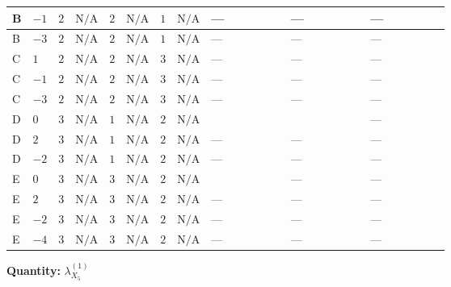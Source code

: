 \documentclass[8pt]{article}
\begin{document}
\begin{landscape}
\begin{longtable}{@{}llcccccc >{\raggedright\arraybackslash}p{0.21\linewidth} >{\raggedright\arraybackslash}p{0.21\linewidth} >{\raggedright\arraybackslash}p{0.21\linewidth}@{}}
\midrule
B & $-1$ & $2$ & $\text{N/A}$ & $2$ & $\text{N/A}$ & $1$ & $\text{N/A}$ & --- & --- & --- \\
\midrule
B & $-3$ & $2$ & $\text{N/A}$ & $2$ & $\text{N/A}$ & $1$ & $\text{N/A}$ & --- & --- & --- \\
\midrule
C & $1$ & $2$ & $\text{N/A}$ & $2$ & $\text{N/A}$ & $3$ & $\text{N/A}$ & --- & --- & --- \\
\midrule
C & $-1$ & $2$ & $\text{N/A}$ & $2$ & $\text{N/A}$ & $3$ & $\text{N/A}$ & --- & --- & --- \\
\midrule
C & $-3$ & $2$ & $\text{N/A}$ & $2$ & $\text{N/A}$ & $3$ & $\text{N/A}$ & --- & --- & --- \\
\midrule
D & $0$ & $3$ & $\text{N/A}$ & $1$ & $\text{N/A}$ & $2$ & $\text{N/A}$ & \scriptsize\adjustbox{max width=\linewidth}{$\begin{gathered} +2 {\lambda_{S_1}^{(1)}} {\lambda_{X_{5}}^{(1)}}\end{gathered}$} & \scriptsize\adjustbox{max width=\linewidth}{$\begin{gathered} +4 {\lambda_{S_2}^{(1)}} {\lambda_{X_{5}}^{(1)}}\end{gathered}$} & --- \\
\midrule
D & $2$ & $3$ & $\text{N/A}$ & $1$ & $\text{N/A}$ & $2$ & $\text{N/A}$ & --- & --- & --- \\
\midrule
D & $-2$ & $3$ & $\text{N/A}$ & $1$ & $\text{N/A}$ & $2$ & $\text{N/A}$ & --- & --- & --- \\
\midrule
E & $0$ & $3$ & $\text{N/A}$ & $3$ & $\text{N/A}$ & $2$ & $\text{N/A}$ & \scriptsize\adjustbox{max width=\linewidth}{$\begin{gathered} +2 {\lambda_{S_1}^{(1)}} {\lambda_{X_{5}}^{(1)}}\end{gathered}$} & --- & --- \\
\midrule
E & $2$ & $3$ & $\text{N/A}$ & $3$ & $\text{N/A}$ & $2$ & $\text{N/A}$ & --- & --- & --- \\
\midrule
E & $-2$ & $3$ & $\text{N/A}$ & $3$ & $\text{N/A}$ & $2$ & $\text{N/A}$ & --- & --- & --- \\
\midrule
E & $-4$ & $3$ & $\text{N/A}$ & $3$ & $\text{N/A}$ & $2$ & $\text{N/A}$ & --- & --- & --- \\
\midrule
\bottomrule
\end{longtable}
\clearpage
\noindent\textbf{Quantity: }${\lambda_{X_{5}}^{(1)}}$\par\smallskip

\end{landscape}
\end{document}
